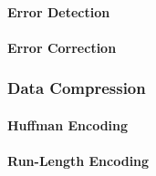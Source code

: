 \paragraph{Error Detection}

\paragraph{Error Correction}

\subsubsection{Data Compression}

\paragraph{Huffman Encoding}

\paragraph{Run-Length Encoding}




\begin{comment}

- Monte Carlo Methods

\end{comment}